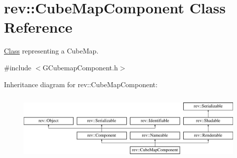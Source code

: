 \hypertarget{classrev_1_1_cube_map_component}{}\section{rev\+::Cube\+Map\+Component Class Reference}
\label{classrev_1_1_cube_map_component}


\mbox{\hyperlink{struct_class}{Class}} representing a Cube\+Map.  




{\ttfamily \#include $<$G\+Cubemap\+Component.\+h$>$}

Inheritance diagram for rev\+::Cube\+Map\+Component\+:\begin{figure}[H]
\begin{center}
\leavevmode
\includegraphics[height=3.435583cm]{classrev_1_1_cube_map_component}
\end{center}
\end{figure}
